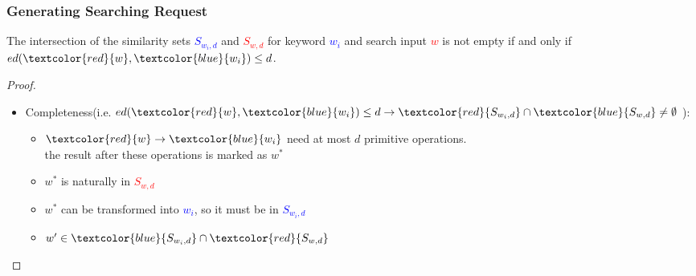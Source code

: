 \documentclass{beamer}
\begin{document}
\begin{frame}
	\frametitle{Generating Searching Request}
	\begin{theorem}
		The intersection of the similarity sets \textcolor{blue}{${S_{{w_i},d}}$} and \textcolor{red}{${S_{w,d}}$} for keyword \textcolor{blue}{$w_i$} and  search input \textcolor{red}{$w$} is not empty if and only if $ed(\textcolor{red}{w},\textcolor{blue}{w_i}) \le d$.
	\end{theorem}
	
	\begin{proof}
		\begin{itemize}
			\item Completeness(i.e. $ed(\textcolor{red}{w},\textcolor{blue}{w_i}) \le d \to \textcolor{red}{S_{{w_i},d}} \cap \textcolor{blue}{S_{w,d}} \ne \emptyset $ ):
			\begin{itemize}
				\item $\textcolor{red}{w} \to \textcolor{blue}{{w_i}}$ need at most $d$ primitive operations.\\the result after these operations is marked as $w^*$
				\item $w^*$ is naturally in \textcolor{red}{${S_{w,d}}$} 
				\item $w^*$ can be transformed into \textcolor{blue}{${w_i}$}, so it must be in \textcolor{blue}{${S_{{w_i},d}}$} 
				\item $w' \in \textcolor{blue}{S_{{w_i},d}} \cap \textcolor{red}{S_{w,d}}$
			\end{itemize}
		\end{itemize}
	\end{proof}
\end{frame}
\end{document}
